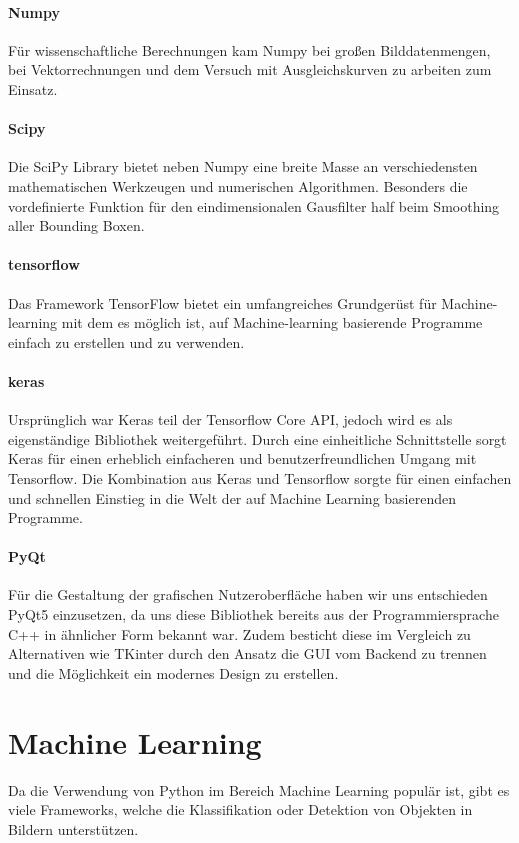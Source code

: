\paragraph{Numpy}
Für wissenschaftliche Berechnungen kam Numpy bei großen Bilddatenmengen, bei Vektorrechnungen und dem Versuch mit Ausgleichskurven zu arbeiten zum Einsatz.

\paragraph{Scipy}
Die SciPy Library bietet neben Numpy eine breite Masse an verschiedensten mathematischen Werkzeugen und numerischen Algorithmen. Besonders die vordefinierte Funktion für den eindimensionalen Gausfilter half beim Smoothing aller Bounding Boxen.

\paragraph{tensorflow}
Das Framework TensorFlow bietet ein umfangreiches Grundgerüst für Machine-learning mit dem es möglich ist, auf Machine-learning basierende Programme einfach zu erstellen und zu verwenden.

\paragraph{keras}
Ursprünglich war Keras teil der Tensorflow Core API, jedoch wird es als eigenständige Bibliothek weitergeführt. Durch eine einheitliche Schnittstelle sorgt Keras für einen erheblich einfacheren und benutzerfreundlichen Umgang mit Tensorflow. Die Kombination aus Keras und Tensorflow sorgte für einen einfachen und schnellen Einstieg in die Welt der auf Machine Learning basierenden Programme.

\paragraph{PyQt}
Für die Gestaltung der grafischen Nutzeroberfläche haben wir uns entschieden PyQt5 einzusetzen, da uns diese Bibliothek bereits aus der Programmiersprache C++ in ähnlicher Form bekannt war. Zudem besticht diese im Vergleich zu Alternativen wie TKinter durch den Ansatz die GUI vom Backend zu trennen und die Möglichkeit ein modernes Design zu erstellen.

	
\section{Machine Learning}
Da die Verwendung von Python im Bereich Machine Learning populär ist, gibt es viele Frameworks, welche die Klassifikation oder Detektion von Objekten in Bildern unterstützen.

